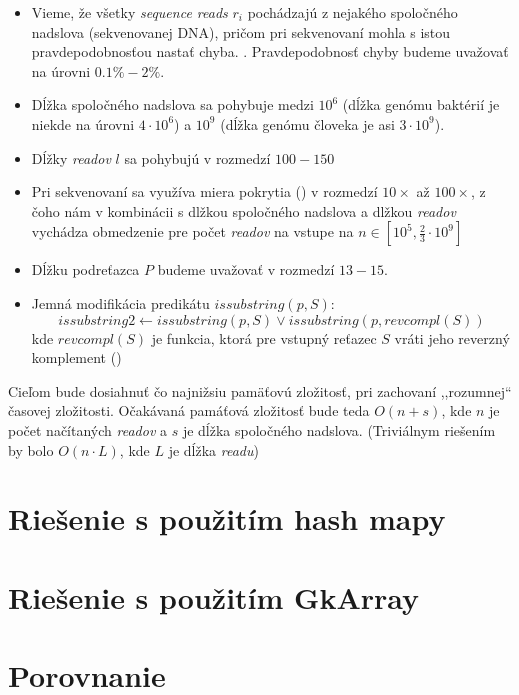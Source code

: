 \begin{itemize}
    \item Vieme, že všetky \emph{sequence reads} $r_i$ pochádzajú z nejakého
    spoločného nadslova (sekvenovanej DNA), pričom pri sekvenovaní mohla s
    istou pravdepodobnosťou nastať chyba. . Pravdepodobnosť chyby budeme uvažovať na úrovni $0.1\% - 2\% $.
    \item Dĺžka spoločného nadslova sa pohybuje medzi $10^6$ (dĺžka genómu
    baktérií je niekde na úrovni $4 \cdot 10^6$) a $10^9$ (dĺžka genómu človeka
    je asi $3 \cdot 10^9$).
    \item Dĺžky \emph{readov} $l$ sa pohybujú v rozmedzí $100 - 150$
    \item Pri sekvenovaní sa využíva miera pokrytia () v rozmedzí $10\times$ až $100\times$, z čoho nám v
    kombinácii s dlžkou spoločného nadslova a dlžkou \emph{readov} vychádza
    obmedzenie pre počet \emph{readov} na vstupe na 
    $n \in [ 10^5, \frac{2}{3} \cdot 10^9 ]$ 
    \item Dĺžku podreťazca $P$ budeme uvažovať v rozmedzí $13 -15$. 
    \item Jemná modifikácia predikátu $issubstring(p, S)$: $$issubstring2
    \leftarrow issubstring(p, S) \vee issubstring(p, revcompl(S))$$ kde
    $revcompl(S)$ je funkcia, ktorá pre vstupný reťazec $S$ vráti jeho reverzný
    komplement ()
\end{itemize}

Cieľom bude dosiahnuť čo najnižsiu pamäťovú zložitosť, pri zachovaní
,,rozumnej`` časovej zložitosti. Očakávaná pamáťová zložitosť bude teda $O(n +
s)$, kde $n$ je počet načítaných \emph{readov} a $s$ je dĺžka spoločného
nadslova. (Triviálnym riešením by bolo $O(n \cdot L)$, kde $L$ je dĺžka
\emph{readu})

\section{Riešenie s použitím hash mapy}

\section{Riešenie s použitím GkArray}

\section{Porovnanie}